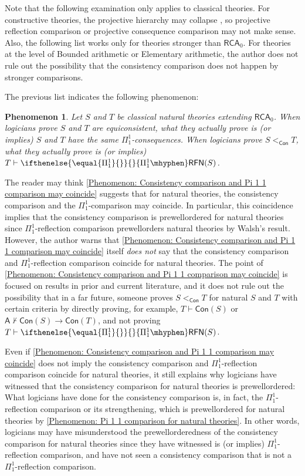 \documentclass{mhkr}
\newtheorem{phenomenon}[phenomenon]{Phenomenon}
\newcommand{\Con}{\mathsf{Con}}
\newcommand{\RFN}[1][]{\ifthenelse{\equal{#1}{}}{}{#1\mhyphen}\mathsf{RFN}}
\newcommand{\RCA}{\mathsf{RCA}}
\begin{document}
{Note that the following examination only applies to classical theories. For constructive theories, the projective hierarchy may collapse \cite{Veldman2022ProjectiveSets}, so projective reflection comparison or projective consequence comparison may not make sense. Also, the following list works only for theories stronger than $\RCA_0$. For theories at the level of Bounded arithmetic or Elementary arithmetic, the author does not rule out the possibility that the consistency comparison does not happen by stronger comparisons.

The previous list indicates the following phenomenon:
\begin{phenomenon} \label{Phenomenon: Consistency comparison and Pi 1 1 comparison may coincide}
    Let $S$ and $T$ be classical natural theories extending $\RCA_0$.
    When logicians prove $S$ and $T$ are equiconsistent, what they actually prove is (or implies) $S$ and $T$ have the same $\Pi^1_1$-consequences.
    When logicians prove $S <_\Con T$, what they actually prove is (or implies) $T \vdash \RFN[\Pi^1_1](S)$. 
\end{phenomenon}
The reader may think \autoref{Phenomenon: Consistency comparison and Pi 1 1 comparison may coincide} suggests that for natural theories, the consistency comparison and the $\Pi^1_1$-comparison may coincide. In particular, this coincidence implies that the consistency comparison is prewellordered for natural theories since $\Pi^1_1$-reflection comparison prewellorders natural theories by Walsh's result.
However, the author warns that \autoref{Phenomenon: Consistency comparison and Pi 1 1 comparison may coincide} itself \emph{does not} say that the consistency comparison and $\Pi^1_1$-reflection comparison coincide for natural theories. The point of \autoref{Phenomenon: Consistency comparison and Pi 1 1 comparison may coincide} is focused on results in prior and current literature, and it does not rule out the possibility that in a far future, someone proves $S<_\Con T$ for natural $S$ and $T$ with certain criteria by directly proving, for example, $T\vdash \Con(S)$ or $\mathsf{A}\nvdash \Con(S)\to \Con(T)$, and not proving $T\vdash \RFN[\Pi^1_1](S)$.

Even if \autoref{Phenomenon: Consistency comparison and Pi 1 1 comparison may coincide} does not imply the consistency comparison and $\Pi^1_1$-reflection comparison coincide for natural theories, it still explains why logicians have witnessed that the consistency comparison for natural theories is prewellordered:
What logicians have done for the consistency comparison is, in fact, the $\Pi^1_1$-reflection comparison or its strengthening, which is prewellordered for natural theories by \autoref{Phenomenon: Pi 1 1 comparison for natural theories}.
In other words, logicians may have misunderstood the prewellorderedness of the consistency comparison for natural theories since they have witnessed is (or implies) $\Pi^1_1$-reflection comparison, and have not seen a consistency comparison that is not a $\Pi^1_1$-reflection comparison.
}
\end{document}

